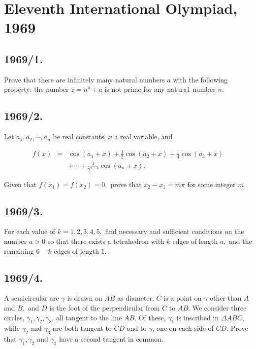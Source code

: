 \documentclass[12pt,thmsa]{article}
\begin{document}
\section{Eleventh International Olympiad, 1969}

\subsection{1969/1.}

Prove that there are infinitely many natural numbers $a$ with the following
property: the number $z=n^{4}+a$ is not prime for any natura1 number $n.$

\subsection{1969/2.}

Let $a_{1},a_{2},\cdots ,a_{n}$ be real constants, $x$ a real variable, and

\begin{eqnarray*}
f(x) &=&\cos (a_{1}+x)+\frac{1}{2}\cos (a_{2}+x)+\frac{1}{4}\cos (a_{3}+x) \\
&&+\cdots +\frac{1}{2^{n-1}}\cos (a_{n}+x).
\end{eqnarray*}

Given that $f(x_{1})=f(x_{2})=0,$ prove that $x_{2}-x_{1}=m\pi $ for some
integer $m.$

\subsection{1969/3.}

For each value of $k=1,2,3,4,5,$ find necessary and sufficient conditions on
the number $a>0$ so that there exists a tetrahedron with $k$ edges of length 
$a,$ and the remaining $6-k$ edges of length $1$.

\subsection{1969/4.}

A semicircular arc $\gamma $ is drawn on $AB$ as diameter. $C$ is a point on 
$\gamma $ other than $A$ and $B,$ and $D$ is the foot of the perpendicular
from $C$ to $AB.$ We consider three circles, $\gamma _{1},\gamma _{2},\gamma
_{3}$, all tangent to the line $AB.$ Of these, $\gamma _{1}$ is inscribed in 
$\Delta ABC,$ while $\gamma _{2}$ and $\gamma _{3}$ are both tangent to $CD$
and to $\gamma $, one on each side of $CD.$ Prove that $\gamma _{1},\gamma
_{2}$ and $\gamma _{3}$ have a second tangent in common.
\end{document}
